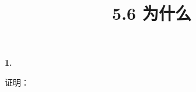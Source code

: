 \documentclass{article}
\theoremstyle{mystyle}
\begin{document}
\title{5.6 为什么}
\maketitle


\textbf{1.}

证明：
\end{document}
